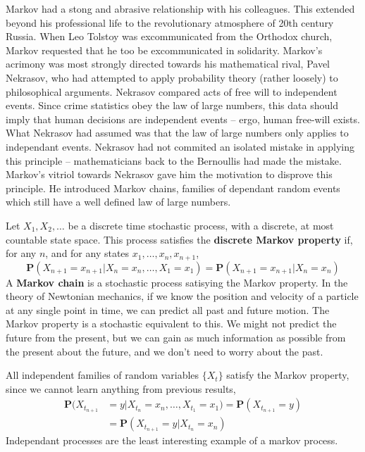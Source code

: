 Markov had a stong and abrasive relationship with his colleagues. This extended beyond his professional life to the revolutionary atmosphere of 20th century Russia. When Leo Tolstoy was excommunicated from the Orthodox church, Markov requested that he too be excommunicated in solidarity. Markov's acrimony was most strongly directed towards his mathematical rival, Pavel Nekrasov, who had attempted to apply probability theory (rather loosely) to philosophical arguments. Nekrasov compared acts of free will to independent events. Since crime statistics obey the law of large numbers, this data should imply that human decisions are independent events -- ergo, human free-will exists. What Nekrasov had assumed was that the law of large numbers only applies to independant events. Nekrasov had not commited an isolated mistake in applying this principle -- mathematicians back to the Bernoullis had made the mistake. Markov's vitriol towards Nekrasov gave him the motivation to disprove this principle. He introduced Markov chains, families of dependant random events which still have a well defined law of large numbers.

Let $X_1, X_2, \dots$ be a discrete time stochastic process, with a discrete, at most countable state space. This process satisfies the {\bf discrete Markov property} if, for any $n$, and for any states $x_1, \dots, x_n, x_{n+1}$,
%
\[ \mathbf{P}(X_{n+1} = x_{n+1} | X_n = x_n, \dots, X_1 = x_1) = \mathbf{P}(X_{n+1} = x_{n+1} | X_n = x_n) \]
%
A {\bf Markov chain} is a stochastic process satisying the Markov property. In the theory of Newtonian mechanics, if we know the position and velocity of a particle at any single point in time, we can predict all past and future motion. The Markov property is a stochastic equivalent to this. We might not predict the future from the present, but we can gain as much information as possible from the present about the future, and we don't need to worry about the past.

\begin{example}
    All independent families of random variables $\{ X_t \}$ satisfy the Markov property, since we cannot learn anything from previous results,
    \begin{align*}
        \mathbf{P}(X_{t_{n+1}} &= y | X_{t_n} = x_n, \dots, X_{t_1} = x_1) = \mathbf{P}(X_{t_{n+1}} = y)\\
        &= \mathbf{P}(X_{t_{n+1}} = y | X_{t_n} = x_n)
    \end{align*}
    Independant processes are the least interesting example of a markov process.
\end{example}

